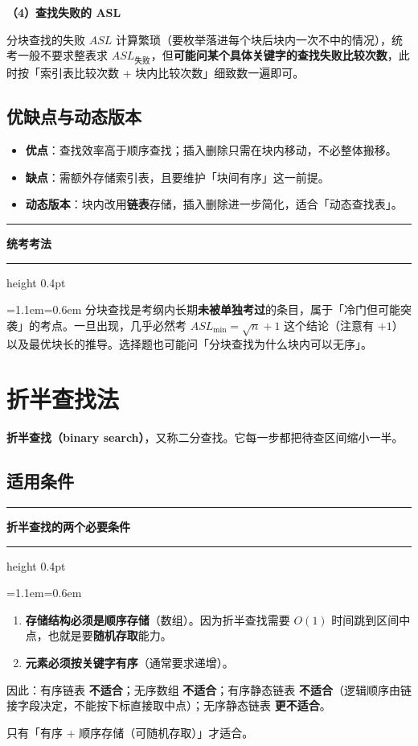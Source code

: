 \documentclass[11pt,openany,UTF8]{ctexbook}
\newcommand{\callouthead}[2]{%
  \par\addvspace{7pt}\noindent
  {\color{#1}\rule[-0.15em]{3pt}{1.05em}}\hspace{0.5em}%
  {\bfseries\color{#1}#2}\par\nobreak\vspace{-0.35em}%
  {\color{rulesep}\hrule height 0.4pt}\nobreak\vspace{0.45em}%
  \begingroup\small\setlength{\parindent}{0pt}%
  \leftskip=1.1em\rightskip=0.6em\noindent\ignorespaces}
\newcommand{\calloutend}{\par\endgroup\addvspace{7pt}}
\newenvironment{callkey}[1]{\callouthead{keybar}{#1}}{\calloutend}
\newenvironment{callexam}[1]{\callouthead{exambar}{#1}}{\calloutend}
\begin{document}
\textbf{（4）查找失败的 ASL}

分块查找的失败 $ASL$ 计算繁琐（要枚举落进每个块后块内一次不中的情况），统考一般不要求整表求 $ASL_{失败}$，但\textbf{可能问某个具体关键字的查找失败比较次数}，此时按「索引表比较次数 + 块内比较次数」细致数一遍即可。

\subsection{优缺点与动态版本}

\begin{itemize}
\item \textbf{优点}：查找效率高于顺序查找；插入删除只需在块内移动，不必整体搬移。
\item \textbf{缺点}：需额外存储索引表，且要维护「块间有序」这一前提。
\item \textbf{动态版本}：块内改用\textbf{链表}存储，插入删除进一步简化，适合「动态查找表」。
\end{itemize}
\begin{callexam}{统考考法}
分块查找是考纲内长期\textbf{未被单独考过}的条目，属于「冷门但可能突袭」的考点。一旦出现，几乎必然考 $ASL_{\min}=\sqrt{n}+1$ 这个结论（注意有 $+1$）以及最优块长的推导。选择题也可能问「分块查找为什么块内可以无序」。

\end{callexam}

\section{折半查找法}

\textbf{折半查找（binary search）}，又称二分查找。它每一步都把待查区间缩小一半。

\subsection{适用条件}

\begin{callkey}{折半查找的两个必要条件}
\begin{enumerate}
\item \textbf{存储结构必须是顺序存储}（数组）。因为折半查找需要 $O(1)$ 时间跳到区间中点，也就是要\textbf{随机存取}能力。
\item \textbf{元素必须按关键字有序}（通常要求递增）。
\end{enumerate}
因此：有序链表 \textbf{不适合}；无序数组 \textbf{不适合}；有序静态链表 \textbf{不适合}（逻辑顺序由链接字段决定，不能按下标直接取中点）；无序静态链表 \textbf{更不适合}。

只有「有序 + 顺序存储（可随机存取）」才适合。

\end{callkey}
\end{document}
